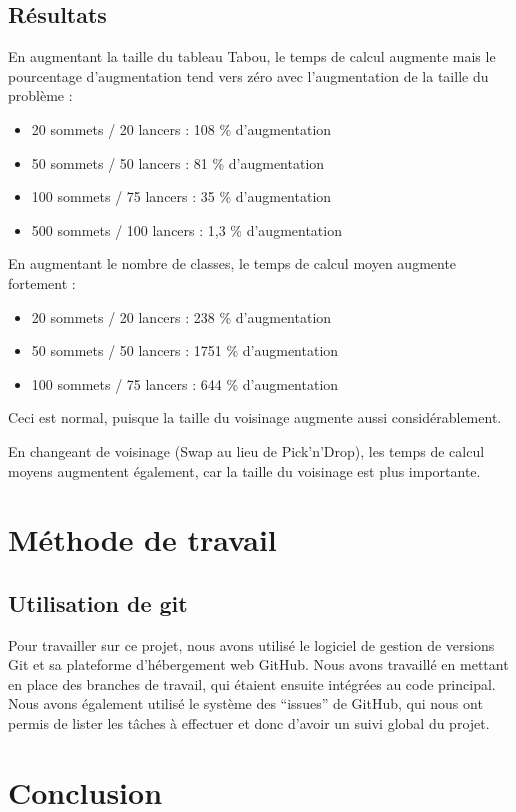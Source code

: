 \documentclass[12pt]{article}
\begin{document}
\subsection{Résultats}

En augmentant la taille du tableau Tabou, le temps de calcul augmente mais le pourcentage d'augmentation tend vers zéro avec l'augmentation de la taille du problème :
\begin{itemize}
\item 20 sommets / 20 lancers : 108 \% d'augmentation
\item 50 sommets / 50 lancers : 81 \% d'augmentation
\item 100 sommets / 75 lancers : 35 \% d'augmentation
\item 500 sommets / 100 lancers : 1,3 \% d'augmentation
\end{itemize}
\bigskip

En augmentant le nombre de classes, le temps de calcul moyen augmente fortement :
\begin{itemize}
\item 20 sommets / 20 lancers : 238 \% d'augmentation
\item 50 sommets / 50 lancers : 1751 \% d'augmentation
\item 100 sommets / 75 lancers : 644 \% d'augmentation
\end{itemize}
Ceci est normal, puisque la taille du voisinage augmente aussi considérablement.
\bigskip 

En changeant de voisinage (Swap au lieu de Pick'n'Drop), les temps de calcul moyens augmentent également, car la taille du voisinage est plus importante.


\newpage

\section{Méthode de travail}
\subsection{Utilisation de git}
Pour travailler sur ce projet, nous avons utilisé le logiciel de gestion de versions Git et sa plateforme d’hébergement web GitHub. Nous avons travaillé en mettant en place des branches de travail, qui étaient ensuite intégrées au code principal. Nous avons également utilisé le système des “issues” de GitHub, qui nous ont permis de lister les tâches à effectuer et donc d’avoir un suivi global du projet.

\section{Conclusion}
		
\end{document}

